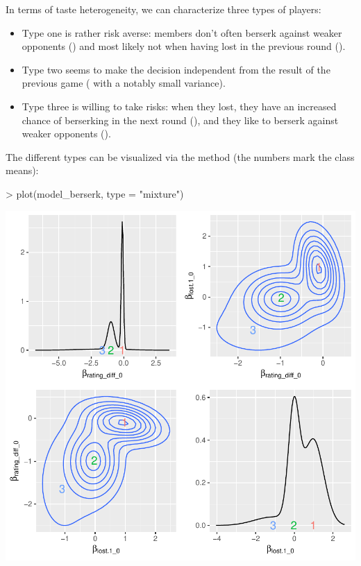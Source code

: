 \documentclass[article,shortnames]{jss}
\newcommand{\fct}[1]{\code{#1()}}
\begin{document}
In terms of taste heterogeneity, we can characterize three types of players:

\begin{itemize}
  \item Type one is rather risk averse: members don't often berserk against weaker opponents () and most likely not when having lost in the previous round ().
  \item Type two seems to make the decision independent from the result of the previous game ( with a notably small variance).
  \item Type three is willing to take risks: when they lost, they have an increased chance of berserking in the next round (), and they like to berserk against weaker opponents ().
\end{itemize}

The different types can be visualized via the \fct{plot} method (the numbers mark the class means):

\begin{Schunk}
\begin{Sinput}
> plot(model_berserk, type = "mixture")
\end{Sinput}
\end{Schunk}
\includegraphics{rprobitb_oelschlaeger_bauer-model-berserk-mixture}
\end{document}
